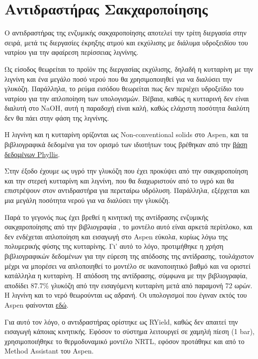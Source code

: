 \documentclass[11pt]{article}
\begin{document}
\section{Αντιδραστήρας Σακχαροποίησης}
\label{sec:org0aecfe0}
Ο αντιδραστήρας της ενζυμικής σακχαροποίησης αποτελεί την τρίτη
διεργασία στην σειρά, μετά τις διεργασίες έκρηξης ατμού και εκχύλισης με
διάλυμα υδροξειδίου του νατρίου για την αφαίρεση περίσσειας λιγνίνης.

Ως είσοδος θεωρείται το προϊόν της διεργασίας εκχύλισης, δηλαδή η
κυτταρίνη με την λιγνίνη και ένα μεγάλο ποσό νερού που θα χρησιμοποιηθεί
για να διαλύσει την γλυκόζη. Παράλληλα, το ρεύμα εισόδου θεωρείται
πως δεν περιέχει υδροξείδιο του νατρίου για την απλοποίηση των υπολογισμών. Βέβαια, καθώς η κυτταρινή δεν είναι διαλυτή στο NaOH, αυτή η παραδοχή είναι καλή, καθώς ελάχιστη ποσότητα διαλύτη δεν θα πάει στην φάση της λιγνίνης.

Η λιγνίνη και η κυτταρίνη ορίζονται ως Non-conventional solids στο
Aspen, και τα βιβλιογραφικά δεδομένα για τον ορισμό των ιδιοτήτων τους
βρέθηκαν από την \href{https://phyllis.nl/Browse/Standard/ECN-Phyllis}{βάση δεδομένων Phyllis}.

Στην έξοδο έχουμε ως υγρό την γλυκόζη που έχει προκύψει από την
σακχαροποίηση και την στερεή κυτταρίνη και λιγνίνη, που θα διαχωριστούν
από το υγρό και θα επιστρέψουν στον αντιδραστήρα για περεταίρω υδρόλυση.
Παράλληλα, εξέρχεται και μια μεγάλη ποσότητα νερού για να διαλύσει την
γλυκόζη.

Παρά το γεγονός πως έχει βρεθεί η κινητική της αντίδρασης ενζυμικής
σακχαροποίησης από την βιβλιογραφία \cite{kadamDevelopmentValidationKinetic2004}, το μοντέλο αυτό είναι αρκετά
περίπλοκο, και δεν ενδέχεται απλοποίηση και εισαγωγή στο Aspen εύκολα,
κυρίως λόγω της πολυμερικής φύσης της κυτταρίνης. Γι' αυτό το λόγο,
προτιμήθηκε η χρήση βιβλιογραφικών δεδομένων για την εύρεση της απόδοσης
της αντίδρασης, τουλάχιστον μέχρι να μπορέσει να απλοποιηθεί το μοντέλο
σε ικανοποιητικό βαθμό και να οριστεί κατάλληλα η κυτταρίνη. Η απόδοση
της αντίδρασης, σύμφωνα με την βιβλιογραφία, αποδίδει 87.7\% γλυκόζη από
την εισαγόμενη κυτταρίνη μετά από παραμονή 72 ωρών. Η λιγνίνη και το
νερό θεωρούνται ως αδρανή. Οι υπολογισμοί που έγιναν εκτός του Aspen φαίνονται \href{https://github.com/Vidianos-Giannitsis/Process-Design/blob/master/Calculations/Saccharification\_Calculations\_2.xlsx}{εδώ}.

Για αυτό τον λόγο, ο αντιδραστήρας ορίστηκε ως RYield, καθώς δεν απαιτεί
την εισαγωγή κάποιας κινητικής. Εφόσον το σύστημα λειτουργεί σε χαμηλή
πίεση (1 bar), χρησιμοποιήθηκε το θερμοδυναμικό μοντέλο NRTL, εφόσον
προτάθηκε και από το Method Assistant του Aspen.
\end{document}
